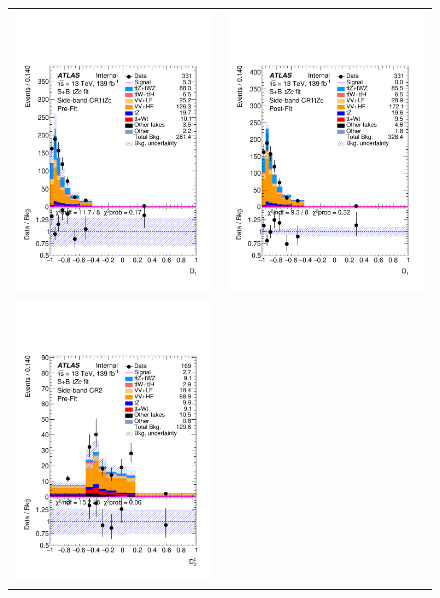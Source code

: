 \begin{figure}[htbp]
	\centering
	\begin{tabular}{cc}
		\includegraphics[width=.45\textwidth]{Chapters/CH8/figures/SPLUSB_CRSR_UsingDL1rcFullSys/Plots/SBCR1} &
		\includegraphics[width=.45\textwidth]{Chapters/CH8/figures/SPLUSB_CRSR_UsingDL1rcFullSys/Plots/SBCR1_postFit} \\
		\includegraphics[width=.45\textwidth]{Chapters/CH8/figures/SPLUSB_CRSR_UsingDL1rcFullSys/Plots/SBCR2} &

\end{tabular}
\end{figure}
